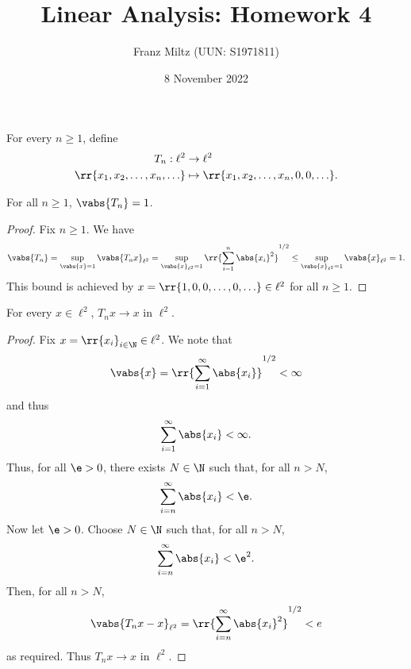 \documentclass{article}
\begin{document}
\title{Linear Analysis: Homework 4}
\author{Franz Miltz (UUN: S1971811)}
\date{8 November 2022}
\maketitle

For every $n\geq 1$, define
\begin{align*}
  T_n:\ell^2 &\to\ell^2 \\
  \rr{x_1,x_2,\ldots,x_n,\ldots} &\mapsto \rr{x_1,x_2,\ldots,x_n,0,0,\ldots}.
\end{align*}

\begin{claim*}[3a]
  For all $n\geq 1$, $\vabs{T_n}=1$.
  \begin{proof}
    Fix $n\geq 1$. We have
    \begin{align*}
      \vabs{T_n} = \sup_{\vabs{x}=1} \vabs{T_n{x}}_{\ell^2} = \sup_{\vabs{x}_{\ell^2}=1} \rr{\sum_{i=1}^{n} \abs{x_i}^2 }^{1/2} \leq \sup_{\vabs{x}_{\ell^2}=1} \vabs{x}_{\ell^2} = 1.
    \end{align*}
    This bound is achieved by $x=\rr{1,0,0,\ldots,0,\ldots}\in\ell^2$ for all $n\geq 1$.
  \end{proof}
\end{claim*}

\begin{claim*}[3b]
  For every $x\in\ell^2$, $T_nx\to x$ in $\ell^2$.
  \begin{proof}
    Fix $x=\rr{x_i}_{i\in\N}\in\ell^2$. We note that
    \begin{align*}
      \vabs{x}=\rr{\sum_{i=1}^{\infty} \abs{x_i}}^{1/2} < \infty
    \end{align*}
    and thus
    \begin{align*}
      \sum_{i=1}^{\infty} \abs{x_i} < \infty.
    \end{align*}
    Thus, for all $\e > 0$, there exists $N\in\N$ such that, for all $n>N$,
    \begin{align*}
      \sum_{i=n}^{\infty} \abs{x_i} < \e.
    \end{align*}
    Now let $\e > 0$. Choose $N\in\N$ such that, for all $n>N$,
    \begin{align*}
      \sum_{i=n}^{\infty} \abs{x_i} < \e^2.
    \end{align*}
    Then, for all $n>N$,
    \begin{align*}
      \vabs{T_n x - x}_{\ell^2}= \rr{\sum_{i=n}^{\infty} \abs{x_i}^2}^{1/2} < e
    \end{align*}
    as required. Thus $T_nx\to x$ in $\ell^2$.
  \end{proof}
\end{claim*}
\end{document}
